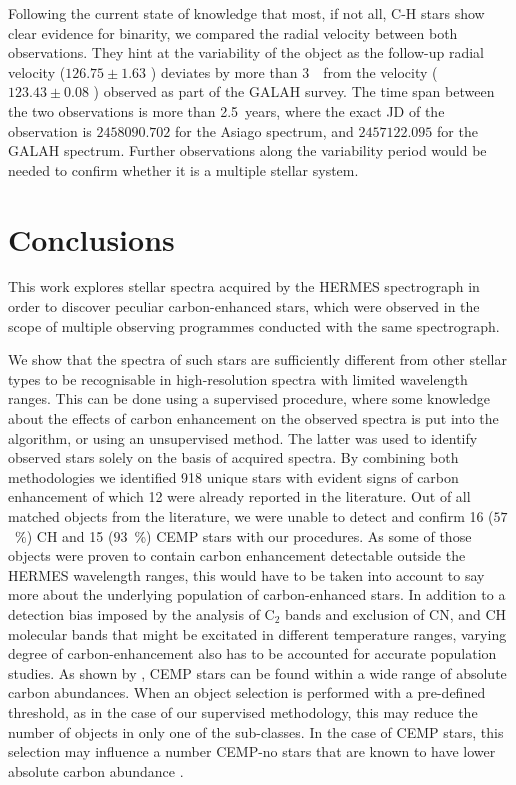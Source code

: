 Following the current state of knowledge \citep{1990ApJ...352..709M, 2016AA...586A.158J, 2016ApJ...826...85S} that most, if not all, C-H stars show clear evidence for binarity, we compared the radial velocity between both observations. They hint at the variability of the object as the follow-up radial velocity ($126.75 \pm 1.63$ \kms) deviates by more than $3$~\kms\ from the velocity ($123.43 \pm 0.08$ \kms) observed as part of the GALAH survey. The time span between the two observations is more than 2.5~years, where the exact JD of the observation is $2458090.702$ for the Asiago spectrum, and $2457122.095$ for the GALAH spectrum. Further observations along the variability period would be needed to confirm whether it is a multiple stellar system.

\section{Conclusions}
\label{sec:summary}
This work explores stellar spectra acquired by the HERMES spectrograph in order to discover peculiar carbon-enhanced stars, which were observed in the scope of multiple observing programmes conducted with the same spectrograph.

We show that the spectra of such stars are sufficiently different from other stellar types to be recognisable in high-resolution spectra with limited wavelength ranges. This can be done using a supervised procedure, where some knowledge about the effects of carbon enhancement on the observed spectra is put into the algorithm, or using an unsupervised method. The latter was used to identify observed stars solely on the basis of acquired spectra. By combining both methodologies we identified 918 unique stars with evident signs of carbon enhancement of which 12 were already reported in the literature. Out of all matched objects from the literature, we were unable to detect and confirm 16 ($57$~\%) CH and 15 ($93$~\%) CEMP stars with our procedures. As some of those objects were proven to contain carbon enhancement detectable outside the HERMES wavelength ranges, this would have to be taken into account to say more about the underlying population of carbon-enhanced stars. In addition to a detection bias imposed by the analysis of C$_2$ bands and exclusion of CN, and CH molecular bands that might be excitated in different temperature ranges, varying degree of carbon-enhancement also has to be accounted for accurate population studies. As shown by \citet{2016ApJ...833...20Y}, CEMP stars can be found within a wide range of absolute carbon abundances. When an object selection is performed with a pre-defined threshold, as in the case of our supervised methodology, this may reduce the number of objects in only one of the sub-classes. In the case of CEMP stars, this selection may influence a number CEMP-no stars that are known to have lower absolute carbon abundance \citep{2016ApJ...833...20Y}.

